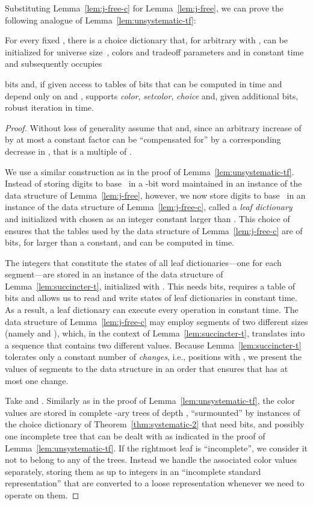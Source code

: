 \documentclass[envcountsame,envcountsect,undated,nolinenumbers]{lnthi}
\def\Tvn#1{\hbox{\textit{#1\/}}}
\begin{document}
Substituting Lemma~\ref{lem:j-free-c} for
Lemma~\ref{lem:j-free},
we can prove the following analogue
of Lemma~\ref{lem:unsystematic-tf}:

\begin{lemma}
\label{lem:unsystematic-tc}For every fixed ,
there is a choice dictionary that, for
arbitrary  with ,
can be initialized for universe size~,
 colors and tradeoff parameters  and 
in constant time and subsequently occupies

bits and,
if given access to tables of
 bits
that can be computed in 
time and depend only on  and ,
supports \Tvn{color}, \Tvn{setcolor},
\Tvn{choice} and,
given  additional bits,
robust iteration in  time.
\end{lemma}

\begin{proof}
Without loss of generality assume that
 and, since an arbitrary increase
of  by at most a constant factor can be
``compensated for'' by a corresponding
decrease in , that  is a multiple of
.

We use a similar construction as in the
proof of Lemma~\ref{lem:unsystematic-tf}.
Instead of storing  digits to base~
in a -bit word maintained
in an instance of the data structure of
Lemma~\ref{lem:j-free}, however, we now
store  digits to base~ in an
instance of the data structure of
Lemma~\ref{lem:j-free-c}, 
called a \emph{leaf dictionary}
and
initialized with
 chosen as an integer
constant larger than .
This choice of  ensures that the tables used
by the data structure of Lemma~\ref{lem:j-free-c}
are of
 bits,
for  larger than a constant,
and can be computed in  time.

The integers that constitute the states of all
leaf dictionaries---one for each segment---are stored in an instance
of the data structure of
Lemma~\ref{lem:succincter-t}, initialized with .
This needs  bits, requires a
table of  bits and
allows us to read and write states of
leaf dictionaries in constant time.
As a result, a leaf dictionary can execute
every operation in constant time.
The data structure of
Lemma~\ref{lem:j-free-c} may employ segments of two
different sizes (namely  and ),
which, in the context of Lemma~\ref{lem:succincter-t},
translates into a sequence 
that contains two different values.
Because Lemma~\ref{lem:succincter-t} tolerates only
a constant number of \emph{changes}, i.e.,
positions  with
, we present the values of
segments to the data structure in an order
that ensures that  has
at most one change.

Take  and .
Similarly as in the proof of Lemma~\ref{lem:unsystematic-tf},
the  color values are stored in
 complete -ary trees
of depth , ``surmounted'' by  instances
of the choice dictionary of
Theorem~\ref{thm:systematic-2} that need
 bits,
and possibly one incomplete tree that can
be dealt with as indicated
in the proof of
Lemma~\ref{lem:unsystematic-tf}.
If the rightmost leaf is ``incomplete'',
we consider it not to belong to any of the trees.
Instead we handle the associated color values separately,
storing them as up to  integers in an  
``incomplete standard representation''
that are converted to a loose representation
whenever we need to operate on them.


\end{proof}
\end{document}
